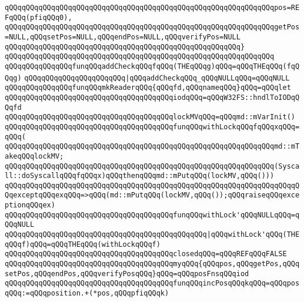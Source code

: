 \verb|qQQqqQQqqQQqqQQqqQQqqQQqqQQqqQQqqQQqqQQqqQQqqQQqqQQqqQQqqQQqqQQqpos=REFqQQq(pfiqQQq0),|\newline
\verb|qQQqqQQqqQQqqQQqqQQqqQQqqQQqqQQqqQQqqQQqqQQqqQQqqQQqqQQqqQQqqQQqgetPos=NULL,qQQqsetPos=NULL,qQQqendPos=NULL,qQQqverifyPos=NULL|\newline
\verb|qQQqqQQqqQQqqQQqqQQqqQQqqQQqqQQqqQQqqQQqqQQqqQQqqQQqqQQq}|\newline
\verb|qQQqqQQqqQQqqQQqqQQqqQQqqQQqqQQqqQQqqQQqqQQqqQQqqQQqqQQqqQQqqQQq|\newline
\verb|qQQqqQQqqQQqqQQqfunqQQqaddCheckqQQqfqQQq(THEqQQqg)qQQq=qQQqTHEqQQq(fqQQqg)|\newline
\verb|qQQqqQQqqQQqqQQqqQQqqQQq|\verb#|qQQqaddCheckqQQq_qQQqNULLqQQq=qQQqNULL#\newline
\newline
\verb|qQQqqQQqqQQqqQQqfunqQQqmkReaderqQQq{qQQqfd,qQQqnameqQQq}qQQq=qQQqlet|\newline
\verb|qQQqqQQqqQQqqQQqqQQqqQQqqQQqqQQqqQQqqQQqiodqQQq=qQQqW32FS::hndlToIODqQQqfd|\newline
\verb|qQQqqQQqqQQqqQQqqQQqqQQqqQQqqQQqqQQqqQQqlockMVqQQq=qQQqmd::mVarInit()|\newline
\verb|qQQqqQQqqQQqqQQqqQQqqQQqqQQqqQQqqQQqqQQqfunqQQqwithLockqQQqfqQQqxqQQq=qQQq(|\newline
\verb|qQQqqQQqqQQqqQQqqQQqqQQqqQQqqQQqqQQqqQQqqQQqqQQqqQQqqQQqqQQqqQQqmd::mTakeqQQqlockMV;|\newline
\verb|qQQqqQQqqQQqqQQqqQQqqQQqqQQqqQQqqQQqqQQqqQQqqQQqqQQqqQQqqQQqqQQq(Syscall::doSyscallqQQqfqQQqx)qQQqthenqQQqmd::mPutqQQq(lockMV,qQQq()))|\newline
\verb|qQQqqQQqqQQqqQQqqQQqqQQqqQQqqQQqqQQqqQQqqQQqqQQqqQQqqQQqqQQqqQQqqQQqqQQqexceptqQQqexqQQq=>qQQq(md::mPutqQQq(lockMV,qQQq());qQQqraiseqQQqexceptionqQQqex)|\newline
\verb|qQQqqQQqqQQqqQQqqQQqqQQqqQQqqQQqqQQqqQQqfunqQQqwithLock'qQQqNULLqQQq=qQQqNULL|\newline
\verb|qQQqqQQqqQQqqQQqqQQqqQQqqQQqqQQqqQQqqQQqqQQqqQQq|\verb#|qQQqwithLock'qQQq(THEqQQqf)qQQq=qQQqTHEqQQq(withLockqQQqf)#\newline
\verb|qQQqqQQqqQQqqQQqqQQqqQQqqQQqqQQqqQQqqQQqclosedqQQq=qQQqREFqQQqFALSE|\newline
\verb|qQQqqQQqqQQqqQQqqQQqqQQqqQQqqQQqqQQqqQQqmyqQQq{qQQqpos,qQQqgetPos,qQQqsetPos,qQQqendPos,qQQqverifyPosqQQq}qQQq=qQQqposFnsqQQqiod|\newline
\verb|qQQqqQQqqQQqqQQqqQQqqQQqqQQqqQQqqQQqqQQqfunqQQqincPosqQQqkqQQq=qQQqposqQQq:=qQQqposition.+(*pos,qQQqpfiqQQqk)|\newline
